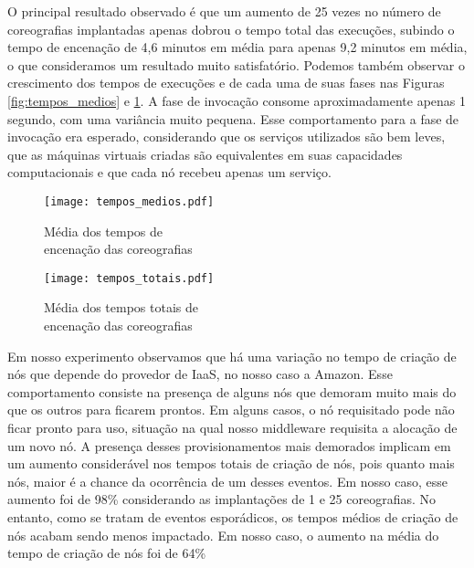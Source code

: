 O principal resultado observado é que um aumento de 25 vezes no número de coreografias implantadas apenas dobrou o tempo total das execuções, subindo o tempo de encenação de 4,6 minutos em média para apenas 9,2 minutos em média, o que consideramos um resultado muito satisfatório. Podemos também observar o crescimento dos tempos de execuções e de cada uma de suas fases nas Figuras \ref{fig:tempos_medios} e \ref{fig:tempos_totais}. A fase de invocação consome aproximadamente apenas 1 segundo, com uma variância muito pequena. Esse comportamento para a fase de invocação era esperado, considerando que os serviços utilizados são bem leves, que as máquinas virtuais criadas são equivalentes em suas capacidades computacionais e que cada nó recebeu apenas um serviço.

\begin{figure}[ht]

\begin{minipage}[b]{0.50\linewidth}
\centering
\texttt{[image: tempos\_medios.pdf]}
\caption{Média dos tempos de \\encenação das coreografias}
\label{fig:tempos_medios}
\end{minipage}
\begin{minipage}[b]{0.50\linewidth}
\centering
\texttt{[image: tempos\_totais.pdf]}
\caption{Média dos tempos totais de \\encenação das coreografias}
\label{fig:tempos_totais}
\end{minipage}

\end{figure} 

Em nosso experimento observamos que há uma variação no tempo de criação de nós que depende do provedor de IaaS, no nosso caso a Amazon. Esse comportamento consiste na presença de alguns nós que demoram muito mais do que os outros para ficarem prontos. Em alguns casos, o nó requisitado pode não ficar pronto para uso, situação na qual nosso middleware requisita a alocação de um novo nó. A presença desses provisionamentos mais demorados implicam em um aumento considerável nos tempos totais de criação de nós, pois quanto mais nós, maior é a chance da ocorrência de um desses eventos. Em nosso caso, esse aumento foi de 98\% considerando as implantações de 1 e 25 coreografias. No entanto, como se tratam de eventos esporádicos, os tempos médios de criação de nós acabam sendo menos impactado. Em nosso caso, o aumento na média do tempo de criação de nós foi de 64\%

